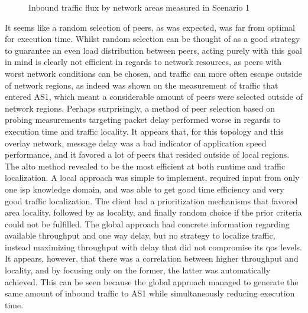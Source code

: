 \begin{figure}[H]
\caption{Inbound traffic flux by network areas measured in Scenario 1}
\label{fig:graph-traffic-scenario1}
\end{figure}

    It seems like a random selection of peers, as was expected, was far from optimal for execution time. 
    Whilst random selection can be thought of as a good strategy to guarantee an even load distribution between peers, acting purely with this goal in mind is clearly not efficient in regards to network resources, as peers with worst network conditions can be chosen, and traffic can more often escape outside of network regions, as indeed was shown on the measurement of traffic that entered AS1, which meant a considerable amount of peers were selected outside of network regions. 
    Perhaps surprisingly, a method of peer selection based on probing measurements targeting packet delay performed worse in regards to execution time and traffic locality.
    It appears that, for this topology and this overlay network, message delay was a bad indicator of application speed performance, and it favored a lot of peers that resided outside of local regions.
    The \gls{alto} method revealed to be the most efficient at both runtime and traffic localization.
    A local approach was simple to implement, required input from only one \gls{isp} knowledge domain, and was able to get good time efficiency and very good traffic localization.
    The client had a prioritization mechanisms that favored area locality, followed by \gls{as} locality, and finally random choice if the prior criteria could not be fulfilled.
    The global approach had concrete information regarding available throughput and one way delay, but no strategy to localize traffic, instead maximizing throughput with delay that did not compromise its \gls{qos} levels.
    It appears, however, that there was a correlation between higher throughput and locality, and by focusing only on the former, the latter was automatically achieved. 
    This can be seen because the global approach managed to generate the same amount of inbound traffic to AS1 while simultaneously reducing execution time.

